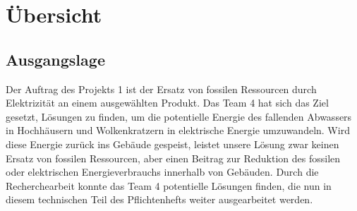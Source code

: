 \section{Übersicht} \label{sec:uebersicht}
\subsection{Ausgangslage}
Der Auftrag des Projekts 1 ist der Ersatz von fossilen Ressourcen durch Elektrizität an einem ausgewählten Produkt. Das Team 4 hat sich das Ziel gesetzt, Lösungen zu finden, um die potentielle Energie des fallenden Abwassers in Hochhäusern und Wolkenkratzern in elektrische Energie umzuwandeln. Wird diese Energie zurück ins Gebäude gespeist, leistet unsere Lösung zwar keinen Ersatz von fossilen Ressourcen, aber einen Beitrag zur Reduktion des fossilen oder elektrischen Energieverbrauchs innerhalb von Gebäuden.
Durch die Recherchearbeit konnte das Team 4 potentielle Lösungen finden, die nun in diesem technischen Teil des Pflichtenhefts weiter ausgearbeitet werden.
\renewcommand\arraystretch{1.5}
\newcommand{\T}{\rule{0pt}{3ex}}       %
\newcommand{\B}{\rule[-2.5ex]{0pt}{0pt}} %
